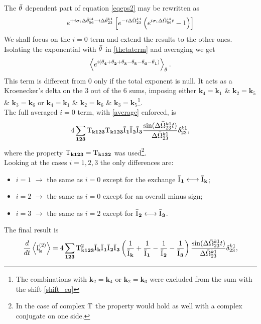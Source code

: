 The $\bar{\theta}^{}$ dependent part of equation \eqref{eqeps2} may be rewritten as 
\begin{equation}
    e^{+i\sigma_i\Delta\bar{\theta}^{i4}_{56} -i \Delta\bar{\theta}^{k1}_{23}}\left[e^{-i\Delta\bar{\Omega}^{k1}_{23}}\left(e^{i\sigma_i\Delta\bar{\Omega}^{i4}_{56}t}-1\right)  \right]
    \label{thetaterm}
\end{equation}
We shall focus on the $i=0$ term and extend the results to the other ones. Isolating the exponential with $\bar{\theta}^{}$ in \eqref{thetaterm} and averaging we get
\begin{equation}
    \left\langle e^{i(\bar{\theta}^{}_\mathbf{4} +\bar{\theta}^{}_\mathbf{2} + \bar{\theta}^{}_\mathbf{3} - \bar{\theta}^{}_\mathbf{5} - \bar{\theta}^{}_\mathbf{6} - \bar{\theta}^{}_\mathbf{1})} \right\rangle_{\bar{\theta}^{}}.
    \label{average}
\end{equation} 
This term is different from $0$ only if the total exponent is null. It acts as a Kroenecker's delta on the $3$ out of the $6$ sums, imposing either $\mathbf{k}_4=\mathbf{k}_1$ \& $\mathbf{k}_2 = \mathbf{k}_5$ \&
$\mathbf{k}_3 = \mathbf{k}_6$ or $\mathbf{k}_4=\mathbf{k}_1$ \& $\mathbf{k}_2 = \mathbf{k}_6$ \& $\mathbf{k}_3 = \mathbf{k}_5$\footnote{The combinations with $\mathbf{k}_2 = \mathbf{k}_4$ or $\mathbf{k}_2 = \mathbf{k}_3$ were 
excluded from the sum with the shift \eqref{shift_eq}}. \\
The full averaged $i=0$ term, with \eqref{average} enforced, is 
\begin{equation}
    4 \sum_{\mathbf{123}} \mathrm{T}_{\mathbf{k123}}\mathrm{T}_{\mathbf{k123}}\bar{\mathrm{I}^{}}_\mathbf{1}\bar{\mathrm{I}^{}}_\mathbf{2}\bar{\mathrm{I}^{}}_\mathbf{3}\frac{\sin(\Delta\bar{\Omega}^{k1}_{23}t)}{\Delta\bar{\Omega}^{k1}_{23}}\delta^{k1}_{23},
\end{equation}
where the property $\mathrm{T}_{\mathbf{k123}} = \mathrm{T}_{\mathbf{k132}}$ was used\footnote{In the case of complex $\mathrm{T}$ the property would hold as well with a complex conjugate on one side.}.
\\
Looking at the cases $i =1,2,3$ the only differences are:
\begin{itemize}
    \item $i=1$ $\longrightarrow$ the same as $i=0$ except for the exchange $\bar{\mathrm{I}^{}}_\mathbf{1} \longleftrightarrow \bar{\mathrm{I}^{}}_\mathbf{k}$;
    \item $i=2$ $\longrightarrow$ the same as $i=0$ except for an overall minus sign;
    \item $i=3$ $\longrightarrow$ the same as $i=2$ except for  $\bar{\mathrm{I}^{}}_\mathbf{2} \longleftrightarrow \bar{\mathrm{I}^{}}_\mathbf{3}$.
\end{itemize}
The final result is
\begin{equation}
    \frac{d}{dt} \left\langle \mathrm{I}^{(2)}_\mathbf{k}\right\rangle = 4 \sum_{\mathbf{123}} \mathrm{T}^2_\mathbf{k123}\bar{\mathrm{I}^{}}_\mathbf{k}\bar{\mathrm{I}^{}}_\mathbf{1}\bar{\mathrm{I}^{}}_\mathbf{2}\bar{\mathrm{I}^{}}_\mathbf{3}
    \left(\frac{1}{\bar{\mathrm{I}^{}}_\mathbf{k}} + \frac{1}{\bar{\mathrm{I}^{}}_\mathbf{1}} - \frac{1}{\bar{\mathrm{I}^{}}_\mathbf{2}}- \frac{1}{\bar{\mathrm{I}^{}}_\mathbf{3}}  \right)
    \frac{\sin(\Delta\bar{\Omega}^{k1}_{23}t)}{\Delta\bar{\Omega}^{k1}_{23}}\delta^{k1}_{23},
    \label{kinetic1}
\end{equation}
